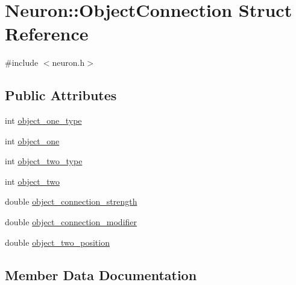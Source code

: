 \hypertarget{structNeuron_1_1ObjectConnection}{}\section{Neuron\+:\+:Object\+Connection Struct Reference}
\label{structNeuron_1_1ObjectConnection}


{\ttfamily \#include $<$neuron.\+h$>$}

\subsection*{Public Attributes}
\begin{DoxyCompactItemize}
\item 
int \mbox{\hyperlink{structNeuron_1_1ObjectConnection_a6174f20de091bf9942b14550890f122d}{object\+\_\+one\+\_\+type}}
\item 
int \mbox{\hyperlink{structNeuron_1_1ObjectConnection_af6bdcfe97aee7b1d47788f92fa57a7a8}{object\+\_\+one}}
\item 
int \mbox{\hyperlink{structNeuron_1_1ObjectConnection_a69d9c1f11a36f759b6aef68236b4cd93}{object\+\_\+two\+\_\+type}}
\item 
int \mbox{\hyperlink{structNeuron_1_1ObjectConnection_a457a80615d216a9db5e90159294bed48}{object\+\_\+two}}
\item 
double \mbox{\hyperlink{structNeuron_1_1ObjectConnection_aaad352b3f1e712aff929a8c2fc370ac1}{object\+\_\+connection\+\_\+strength}}
\item 
double \mbox{\hyperlink{structNeuron_1_1ObjectConnection_a52bbd1a5fb20ee3e5e10c36002b4dcba}{object\+\_\+connection\+\_\+modifier}}
\item 
double \mbox{\hyperlink{structNeuron_1_1ObjectConnection_a2dd04a4740d11779423a2ba5e94d8f5e}{object\+\_\+two\+\_\+position}}
\end{DoxyCompactItemize}


\subsection{Member Data Documentation}
\mbox{\label{structNeuron_1_1ObjectConnection_a52bbd1a5fb20ee3e5e10c36002b4dcba}} 
